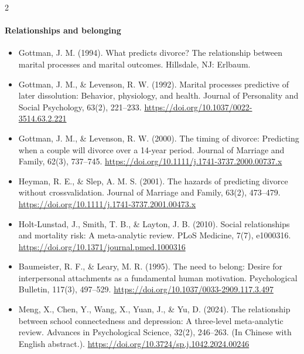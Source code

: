 \documentclass[10pt]{article}
\theoremstyle{definition}
\theoremstyle{remark}
\begin{document}
\begin{multicols}{2}
\paragraph{Relationships and belonging}
\begin{itemize}[leftmargin=1em,itemsep=0pt,topsep=1pt,parsep=0pt]
\item Gottman, J. M. (1994). What predicts divorce? The relationship between marital processes and marital outcomes. Hillsdale, NJ: Erlbaum.
\item Gottman, J. M., \& Levenson, R. W. (1992). Marital processes predictive of later dissolution: Behavior, physiology, and health. Journal of Personality and Social Psychology, 63(2), 221--233. \url{https://doi.org/10.1037/0022-3514.63.2.221}
\item Gottman, J. M., \& Levenson, R. W. (2000). The timing of divorce: Predicting when a couple will divorce over a 14-year period. Journal of Marriage and Family, 62(3), 737--745. \url{https://doi.org/10.1111/j.1741-3737.2000.00737.x}
\item Heyman, R. E., \& Slep, A. M. S. (2001). The hazards of predicting divorce without crossvalidation. Journal of Marriage and Family, 63(2), 473--479. \url{https://doi.org/10.1111/j.1741-3737.2001.00473.x}
\item Holt-Lunstad, J., Smith, T. B., \& Layton, J. B. (2010). Social relationships and mortality risk: A meta-analytic review. PLoS Medicine, 7(7), e1000316. \url{https://doi.org/10.1371/journal.pmed.1000316}
\item Baumeister, R. F., \& Leary, M. R. (1995). The need to belong: Desire for interpersonal attachments as a fundamental human motivation. Psychological Bulletin, 117(3), 497--529. \url{https://doi.org/10.1037/0033-2909.117.3.497}
\item Meng, X., Chen, Y., Wang, X., Yuan, J., \& Yu, D. (2024). The relationship between school connectedness and depression: A three-level meta-analytic review. Advances in Psychological Science, 32(2), 246--263. (In Chinese with English abstract.). \url{https://doi.org/10.3724/sp.j.1042.2024.00246}
\end{itemize}

\end{multicols}
\end{document}
